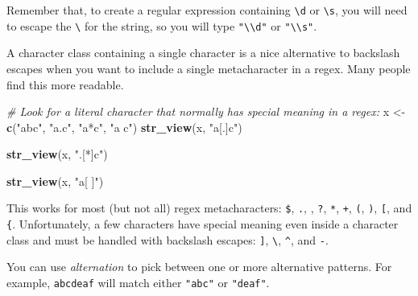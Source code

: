 \documentclass[]{book}
\newenvironment{Shaded}{\begin{snugshade}}{\end{snugshade}}
\newcommand{\KeywordTok}[1]{\textcolor[rgb]{0.13,0.29,0.53}{\textbf{#1}}}
\newcommand{\StringTok}[1]{\textcolor[rgb]{0.31,0.60,0.02}{#1}}
\newcommand{\CommentTok}[1]{\textcolor[rgb]{0.56,0.35,0.01}{\textit{#1}}}
\newcommand{\NormalTok}[1]{#1}
\begin{document}
Remember that, to create a regular expression containing
\texttt{\textbackslash{}d} or \texttt{\textbackslash{}s}, you will need
to escape the \texttt{\textbackslash{}} for the string, so you will type
\texttt{"\textbackslash{}\textbackslash{}d"} or
\texttt{"\textbackslash{}\textbackslash{}s"}.

A character class containing a single character is a nice alternative to
backslash escapes when you want to include a single metacharacter in a
regex. Many people find this more readable.

\begin{Shaded}
\begin{Highlighting}[]
\CommentTok{# Look for a literal character that normally has special meaning in a regex:}
\NormalTok{x <-}\StringTok{ }\KeywordTok{c}\NormalTok{(}\StringTok{"abc"}\NormalTok{, }\StringTok{"a.c"}\NormalTok{, }\StringTok{"a*c"}\NormalTok{, }\StringTok{"a c"}\NormalTok{)}
\KeywordTok{str_view}\NormalTok{(x, }\StringTok{"a[.]c"}\NormalTok{)}
\end{Highlighting}
\end{Shaded}

\hypertarget{htmlwidget-4018eef1a407a0df6b52}{}

\begin{Shaded}
\begin{Highlighting}[]
\KeywordTok{str_view}\NormalTok{(x, }\StringTok{".[*]c"}\NormalTok{)}
\end{Highlighting}
\end{Shaded}

\hypertarget{htmlwidget-5b1b2f4ad92281566982}{}

\begin{Shaded}
\begin{Highlighting}[]
\KeywordTok{str_view}\NormalTok{(x, }\StringTok{"a[ ]"}\NormalTok{)}
\end{Highlighting}
\end{Shaded}

\hypertarget{htmlwidget-25c3e940e6859592f801}{}

This works for most (but not all) regex metacharacters: \texttt{\$},
\texttt{.}, \texttt{\textbar{}}, \texttt{?}, \texttt{*}, \texttt{+},
\texttt{(}, \texttt{)}, \texttt{{[}}, and \texttt{\{}. Unfortunately, a
few characters have special meaning even inside a character class and
must be handled with backslash escapes: \texttt{{]}},
\texttt{\textbackslash{}}, \texttt{\^{}}, and \texttt{-}.

You can use \emph{alternation} to pick between one or more alternative
patterns. For example, \texttt{abc\textbar{}deaf} will match either
\texttt{"abc"} or \texttt{"deaf"}.
\end{document}
